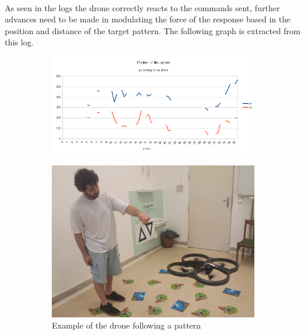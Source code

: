 \documentclass[11pt,twoside,a4paper]{article}
\begin{document}
\paragraph{} As seen in the logs the drone correctly reacts to the commands
sent, further advances need to be made in modulating the force of the response
based in the position and distance of the target pattern. The following graph is
extracted from this log.
\begin{figure}[hbtp]
  \centering
\begin{subfigure}{.99\textwidth}
  \centering
  \includegraphics[width=1\linewidth]{log2_graph.png}
\end{subfigure}
\end{figure}


\begin{figure}[hbtp]
  \centering
\begin{subfigure}{.99\textwidth}
  \centering
  \includegraphics[width=1\linewidth]{tracking.jpg}
Example of the drone following a pattern
\end{subfigure}
\end{figure}
\end{document}
